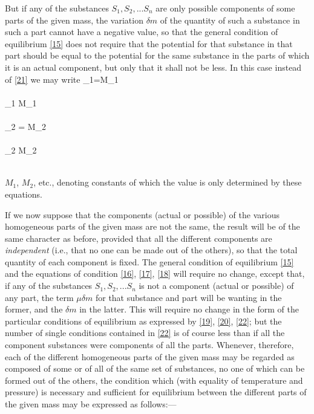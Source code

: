 \documentclass[12pt]{memoir}
\begin{document}
But if any of the substances $S_1, S_2, ... S_n$ are only possible components of some parts of the given mass, the variation $\delta m$ of the quantity of such a substance in such a part cannot have a negative value, so that the general condition of equilibrium \ref{15} does not require that the potential for that substance in that part should be equal to the potential for the same substance in the parts of which it is an actual component, but only that it shall not be less. In this case instead of \ref{21} we may write
\eqs
\mu_1=M_1 \\
 \\
\mu_1 \geq  M_1 \\
\\
\mu_2 =  M_2 \\
\\
\mu_2 \geq  M_2 \\
\\
\label{22} \eqe

$M_1$, $M_2$, etc., denoting constants of which the value is only determined by these equations.

If we now suppose that the components (actual or possible) of the various homogeneous parts of the given mass are not the same, the result will be of the same character as before, provided that all the different components are \textit{independent} (i.e., that no one can be made out of the others), so that the total quantity of each component is fixed. The general condition of equilibrium \ref{15} and the equations of condition \ref{16}, \ref{17}, \ref{18} will require no change, except that, if any of the substances $S_1, S_2, ... S_n$ is not a component (actual or possible) of any part, the term  $\mu \delta m$ for that substance and part will be wanting in the former, and the $\delta m$ in the latter. This will require no change in the form of the particular conditions of equilibrium as expressed by \ref{19}, \ref{20}, \ref{22}; but the number of single conditions contained in \ref{22} is of course less than if all the component substances were components of all the parts. Whenever, therefore, each of the different homogeneous parts of the given mass may be regarded as composed of some or of all of the same set of substances, no one of which can be formed out of the others, the condition which (with equality of temperature and pressure) is necessary and sufficient for equilibrium between the different parts of the given mass may be expressed as follows:---
\end{document}
